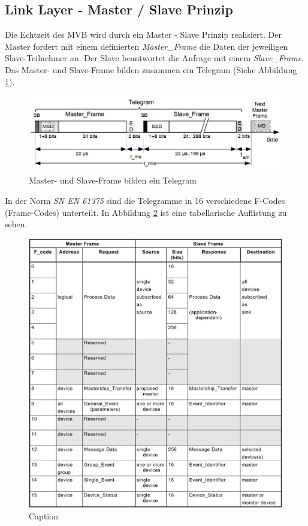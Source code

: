 \subsection{Link Layer - Master / Slave Prinzip}
Die Echtzeit des MVB wird durch ein Master - Slave Prinzip realisiert. Der Master fordert mit einem definierten \textit{Master\_Frame} die Daten der jeweiligen Slave-Teilnehmer an. Der Slave beantwortet die Anfrage mit einem \textit{Slave\_Frame}. Das Master- und Slave-Frame bilden zusammen ein Telegram (Siehe Abbildung \ref{fig:Fig39_Telegamm_definition.png}). 

\begin{figure}[h!]
    \centering
    \includegraphics[width=0.85\linewidth]{Figures/Chap2/Grundlagen/MVB_DOKU/Frames und Telegramme/Fig39_Telegamm_definition.png}
    \caption{Master- und Slave-Frame bilden ein Telegram}
    \label{fig:Fig39_Telegamm_definition.png}
\end{figure}

In der Norm \textit{SN EN 61375} sind die Telegramme in 16 verschiedene F-Codes (Frame-Codes) unterteilt. In Abbildung \ref{fig:FCodeListe} ist eine tabellarische Auflistung zu sehen. 

\begin{figure}[h!]
    \centering
    \includegraphics[width=0.8\linewidth]{Figures/Chap2/Grundlagen/MVB_DOKU/Frames und Telegramme/F-Code Liste.png}
    \caption{Caption}
    \label{fig:FCodeListe}
\end{figure}

